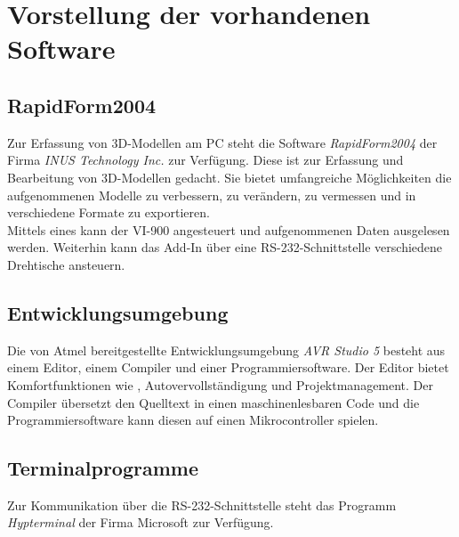 \chapter{Vorstellung der vorhandenen Software}
\label{cha:Software}

\section{RapidForm2004}
\label{sec:RapidForm}
Zur Erfassung von 3D-Modellen am PC steht die Software \emph{RapidForm2004} der Firma \emph{INUS Technology Inc.} zur Verfügung. Diese ist zur Erfassung und Bearbeitung von 3D-Modellen gedacht. Sie bietet umfangreiche Möglichkeiten die aufgenommenen Modelle zu verbessern, zu verändern, zu vermessen und in verschiedene Formate zu exportieren.\\
Mittels eines  kann der VI-900 angesteuert und aufgenommenen Daten ausgelesen werden. Weiterhin kann das Add-In über eine RS-232-Schnittstelle verschiedene Drehtische ansteuern.

\section{Entwicklungsumgebung}
\label{sec:Entwicklungsumgebung}
Die von Atmel bereitgestellte Entwicklungsumgebung \emph{AVR Studio 5} besteht aus einem Editor, einem Compiler und einer Programmiersoftware. Der Editor bietet Komfortfunktionen wie , Autovervollständigung und Projektmanagement. Der Compiler übersetzt den Quelltext in einen maschinenlesbaren Code und die Programmiersoftware kann diesen auf einen Mikrocontroller spielen.

\section{Terminalprogramme}
\label{sec:Terminal}
Zur Kommunikation über die RS-232-Schnittstelle steht das Programm \emph{Hypterminal} der Firma Microsoft zur Verfügung.


